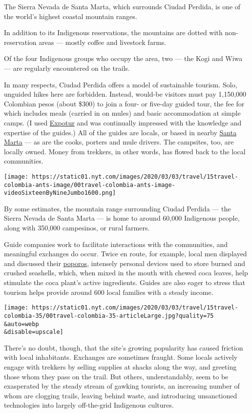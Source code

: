 The Sierra Nevada de Santa Marta, which surrounds Ciudad Perdida, is one
of the world's highest coastal mountain ranges.

In addition to its Indigenous reservations, the mountains are dotted
with non-reservation areas --- mostly coffee and livestock farms.

Of the four Indigenous groups who occupy the area, two --- the Kogi and
Wiwa --- are regularly encountered on the trails.

In many respects, Ciudad Perdida offers a model of sustainable tourism.
Solo, unguided hikes here are forbidden. Instead, would-be visitors must
pay 1,150,000 Colombian pesos (about \$300) to join a four- or five-day
guided tour, the fee for which includes meals (carried in on mules) and
basic accommodation at simple camps. (I used
\href{https://expotur-eco.com/en/}{Expotur} and was continually
impressed with the knowledge and expertise of the guides.) All of the
guides are locals, or based in nearby
\href{https://www.nytimes.com/2010/09/19/travel/19nextstop.html}{Santa
Marta} --- as are the cooks, porters and mule drivers. The campsites,
too, are locally owned. Money from trekkers, in other words, has flowed
back to the local communities.

\texttt{[image: https://static01.nyt.com/images/2020/03/03/travel/15travel-colombia-ants-image/00travel-colombia-ants-image-videoSixteenByNineJumbo1600.png]}

By some estimates, the mountain range surrounding Ciudad Perdida --- the
Sierra Nevada de Santa Marta --- is home to around 60,000 Indigenous
people, along with 350,000 campesinos, or rural farmers.

Guide companies work to facilitate interactions with the communities,
and meaningful exchanges do occur. Twice en route, for example, local
men displayed and discussed their
\href{https://www.youtube.com/watch?v=43M-J5ReoqQ}{poporos}, intensely
personal devices used to store burned and crushed seashells, which, when
mixed in the mouth with chewed coca leaves, help stimulate the coca
plant's active ingredients. Guides are also eager to stress that tourism
helps provide around 600 local families with a steady income.

\texttt{[image: https://static01.nyt.com/images/2020/03/03/travel/15travel-colombia-35/00travel-colombia-35-articleLarge.jpg?quality=75\\\&auto=webp\\\&disable=upscale]}

There's no doubt, though, that the site's growing popularity has caused
friction with local inhabitants. Exchanges are sometimes fraught. Some
locals actively engage with trekkers by selling supplies at shacks along
the way, and greeting those whom they pass on the trail. But others,
understandably, seem to be exasperated by the steady stream of gawking
tourists, an increasing number of whom are clogging trails, leaving
behind waste, and introducing unsanctioned technologies into largely
off-the-grid Indigenous cultures.

